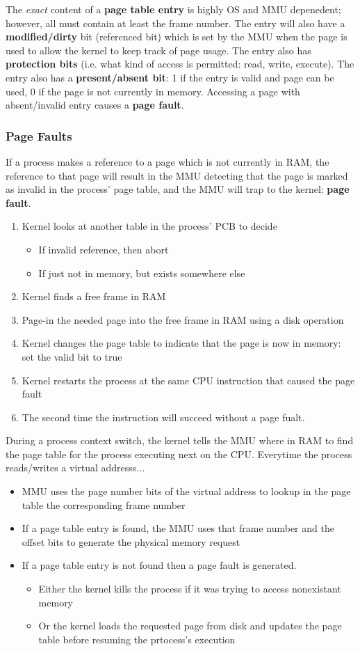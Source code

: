 \documentclass{article}
\newcommand{\bold}[1]{\textbf{#1}}
\renewcommand{\b}{\item[$\circ$]}
\newcommand{\newlist}{\begin{itemize}}
\renewcommand{\endlist}{\end{itemize}}
\begin{document}
The \emph{exact} content of a \bold{page table entry} is highly OS and MMU depenedent; however, all must contain at least the frame number. The entry will also have a \bold{modified/dirty} bit (referenced bit) which is set by the MMU when the page is used to allow the kernel to keep track of page usage. The entry also has \bold{protection bits} (i.e. what kind of access is permitted: read, write, execute). The entry also has a \bold{present/absent bit}: 1 if the entry is valid and page can be used, 0 if the page is not currently in memory. Accessing a page with absent/invalid entry causes a \bold{page fault}. 

\subsubsection{Page Faults}

If a process makes a reference to a page which is not currently in RAM, the reference to that page will result in the MMU detecting that the page is marked as invalid in the process' page table, and the MMU will trap to the kernel: \bold{page fault}. 

\begin{enumerate}
    \item Kernel looks at another table in the process' PCB to decide
        \newlist 
        \b If invalid reference, then abort
        \b If just not in memory, but exists somewhere else
        \endlist
    \item Kernel finds a free frame in RAM
    \item Page-in the needed page into the free frame in RAM using a disk operation
    \item Kernel changes the page table to indicate that the page is now in memory: set the valid bit to true
    \item Kernel restarts the process at the same CPU instruction that caused the page fault
    \item The second time the instruction will succeed without a page fualt. 
\end{enumerate}

During a process context switch, the kernel tells the MMU where in RAM to find the page table for the process executing next on the CPU. Everytime the process reads/writes a virtual addresss...

\newlist 
\b MMU uses the page number bits of the virtual address to lookup in the page table the corresponding frame number
\b If a page table entry is found, the MMU uses that frame number and the offset bits to generate the physical memory request 
\b If a page table entry is not found then a page fault is generated. 
\newlist 
\b Either the kernel kills the process if it was trying to access nonexistant memory
\b Or the kernel loads the requested page from disk and updates the page table before resuming the prtocess's execution
\endlist
\endlist
\end{document}
